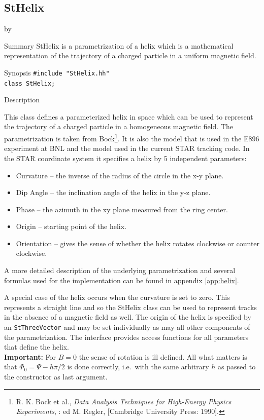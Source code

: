\documentclass[twoside]{article}
\newcommand{\comp}[1]{\texttt{#1}}%
\newcommand{\entrylabel}[1]{\mbox{\textbf{{#1}}}\hfil}%
\newenvironment{entry}
{\begin{list}{}%
    {\renewcommand{\makelabel}{\entrylabel}%
     \setlength{\labelwidth}{90pt}%
     \setlength{\leftmargin}{\labelwidth}
     \advance\leftmargin by \labelsep%
      }%
    }%
  {\end{list}}
\newcommand{\Entrylabel}[1]%
{\raisebox{0pt}[1ex][0pt]{\makebox[\labelwidth][l]%
    {\parbox[t]{\labelwidth}{\hspace{0pt}\textbf{{#1}}}}}}
\newenvironment{Entry}%
{\renewcommand{\entrylabel}{\Entrylabel}\begin{entry}}%
  {\end{entry}}
\begin{document}
\subsection{StHelix } \label{StHelix}
\begin{Entry}
\item[Summary]
    StHelix is a parametrization of a helix which is a mathematical
    representation of the trajectory of a charged particle in a
    uniform magnetic field.

\item[Synopsis]
    \verb+#include "StHelix.hh"+\\
    \verb+class StHelix;+
    
    
\item[Description]   
    
    This class defines a parameterized helix in space which can be
    used to represent the trajectory of a charged particle in a
    homogeneous magnetic field.  The parametrization is taken from
    Bock\footnote{R. K. Bock et al., {\em Data Analysis Techniques for High-Energy Physics Experiments},
      : ed M. Regler, [Cambridge University Press: 1990]. }.
    It is also the model that is used in
    the E896 experiment at BNL and the model used in the current
    STAR tracking code.  In the STAR coordinate system it specifies
    a helix by 5 independent parameters:
    \begin{itemize}
      \item Curvature -- the inverse of the radius of the circle in the
        x-y plane.
      \item Dip Angle -- the inclination angle of the helix in the y-z plane.
      \item Phase -- the azimuth in the xy plane measured from the ring center.
      \item Origin -- starting point of the helix.
      \item Orientation -- gives the sense of whether the helix rotates
        clockwise or counter clockwise.
    \end{itemize}
    A more detailed description of the underlying parametrization and
    several formulas used for the implementation can be found in
    appendix \ref{app:helix}.

    A special case of the helix occurs when the curvature is set to
    zero.  This represents a straight line 
    and so the StHelix class can be used to represent tracks in
    the absence of a magnetic field as well.  The origin of the helix
    is specified by an \comp{StThreeVector} and may be set
    individually as may all other components of the parametrization.
    The interface provides access functions for all parameters that define
    the helix. \\
    \textbf{Important:} For $B = 0$ the sense of rotation is ill defined.
    All what matters is that $\Phi_0 = \Psi - h \pi/2$ is done correctly,
    i.e.~with the same arbitrary $h$ as passed to the constructor as last
    argument. 


\end{Entry}
\end{document}
